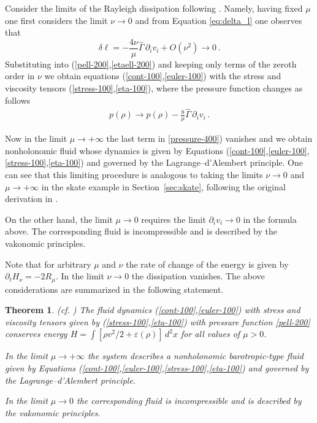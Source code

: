 \documentclass[11pt]{article}
\newtheorem{theorem}[lemma]{Theorem}
\theoremstyle{definition}
\newcounter{ai}
\begin{document}
Consider the limits of the Rayleigh dissipation following \cite{kozlov1992problem}. Namely, having fixed $\mu$ one first considers the limit $\nu\to 0$ and from Equation \eqref{eq:delta_l} one observes that 
 $$
 \delta \ell = -\frac{4\nu}{\mu}\hat\Gamma\,\partial_i v_i  +O(\nu^{2})\to 0\,.
 $$
Substituting into (\ref{pell-200},\ref{etaell-200}) and 
keeping only terms of the zeroth order in $\nu$ we obtain equations (\ref{cont-100},\ref{euler-100}) with the stress and viscosity tensors (\ref{stress-100},\ref{eta-100}), where the pressure function changes as follows
\begin{align}
p(\rho) \to p(\rho) -\frac{8}{\mu}\hat\Gamma \,\partial_iv_i\,.
 \label{pressure-400}
\end{align}

Now in the limit $\mu \to +\infty$ the last term in \eqref{pressure-400}) vanishes and we obtain nonholonomic fluid whose dynamics is given by Equations (\ref{cont-100},\ref{euler-100},\ref{stress-100},\ref{eta-100}) and governed by the Lagrange--d'Alembert principle.
One can see that this limiting procedure is analogous to taking the limits $\nu\to 0$ and $\mu\to +\infty$ 
in the skate example in Section~\ref{sec:skate}, following the original derivation in \cite{kozlov1983realization}. 

On the other hand,  the limit $\mu\to 0$ requires the limit $\partial_i v_i\to 0$ in the formula above. The corresponding fluid is incompressible and is described by the vakonomic principles.
\medskip

Note that for  arbitrary $\mu$ and $\nu$ the rate of change of the energy is given by
$\partial_t H_\nu=- 2R_\mu$. In the limit $\nu\to 0$ the dissipation vanishes. The above considerations are summarized in the following statement.

\begin{theorem}{\rm (cf. \cite{monteiro2023hamiltonian})}
The fluid dynamics (\ref{cont-100},\ref{euler-100}) with stress and viscosity tensors given by (\ref{stress-100},\ref{eta-100}) with  pressure function \eqref{pell-200} conserves energy $  H =\int  [{\rho v^2}/2 +\varepsilon(\rho) ]\,d^2x$ for all values of $\mu>0$. 


In the limit $\mu \to +\infty$ the system describes a nonholonomic barotropic-type fluid given by Equations (\ref{cont-100},\ref{euler-100},\ref{stress-100},\ref{eta-100}) and governed by the Lagrange--d'Alembert principle.

In the limit $\mu\to 0$ the corresponding fluid is incompressible and is described by the vakonomic principles.
\end{theorem}
\end{document}
